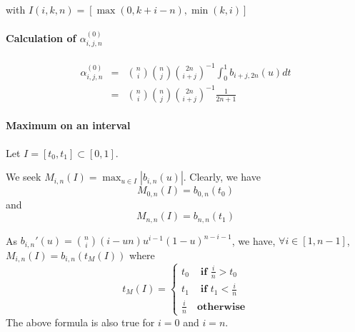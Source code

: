 \documentclass {article}
\newcommand\bernstein[2]{b_{#1, #2}}
\begin{document}
with $I(i,k,n) = [ \max(0, k+i-n), \min(k,i) ]$


\paragraph{Calculation of $\alpha_{i,j,n}^{(0)}$}
\begin{eqnarray*}
  \alpha_{i,j,n}^{(0)}
  &=& { n \choose i } { n \choose j } { 2n \choose i+j }^{-1} \int_0^1 \bernstein{i+j}{2n}(u) dt \\
  &=& { n \choose i } { n \choose j } { 2n \choose i+j }^{-1} \frac{1}{2n + 1}
\end{eqnarray*}


\paragraph{Maximum on an interval}
Let $I = \left[ t_0, t_1 \right] \subset \left[ 0,1 \right]$.

We seek $ M_{i,n} (I) = \max_{u \in I} |\bernstein{i}{n} (u)| $.
Clearly, we have
$$ M_{0, n} (I) = \bernstein{0}{n} (t_0) $$
and
$$ M_{n, n} (I) = \bernstein{n}{n} (t_1) $$

As $\bernstein{i}{n}' (u) = { n \choose i } ( i - u n ) u^{i-1} (1-u)^{n-i-1}$,
we have, $\forall i \in \left[ 1, n-1 \right]$, $ M_{i,n} (I) = \bernstein{i}{n} (t_M(I)) $
where
\begin{equation}
  t_M (I) = \left\lbrace
  \begin{array}{cl}
    t_0 & \textbf{ if } \frac{i}{n} > t_0 \\
    t_1 & \textbf{ if } t_1 < \frac{i}{n} \\
    \frac{i}{n} & \textbf{otherwise}
  \end{array}
  \right.
\end{equation}
The above formula is also true for $i = 0$ and $i=n$.
\end{document}
